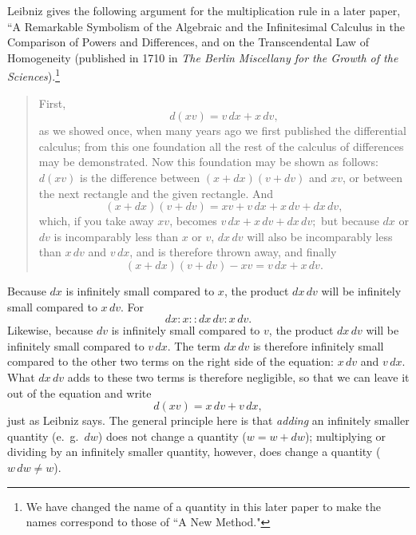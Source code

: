 \documentclass[twoside,openright]{article}
\begin{document}
 Leibniz gives the following argument for the multiplication rule in a
 later paper, ``A Remarkable Symbolism of the Algebraic and the
 Infinitesimal Calculus in the Comparison of Powers and Differences,
 and on the Transcendental Law of Homogeneity (published in 1710 in
 {\em The Berlin Miscellany for the Growth of the
   Sciences}).\footnote{We have changed the name of a quantity in
   this later paper to make the names correspond to those of ``A New
   Method."}
 \begin{quote}
First, 
$$d(xv) = v\,dx + x\,dv,$$
as we showed once, when many years ago we first published the
differential calculus; from this one foundation all the rest of the
calculus of differences may be demonstrated.  Now this foundation may
be shown as follows: $d(xv)$ is the difference between $(x+dx)(v+dv)$
and $xv$, or between the next rectangle and the given rectangle.  And
$$(x+dx)(v+dv) = xv + v\,dx + x\,dv + dx\,dv,$$
which, if you take away $xv$, becomes
$v\,dx + x\,dv + dx\,dv;$
but because $dx$ or $dv$ is incomparably less than $x$ or $v$, $dx\,dv$ will
also be incomparably less than $x\,dv$ and $v\,dx$, and is therefore thrown
away, and finally
$$(x+dx)(v+dv) - xv = v\,dx + x\,dv.$$
\end{quote}

 
Because $dx$ is infinitely small compared to $x$, the product $dx\,dv$
will be infinitely small compared to $x\,dv$. For
$$dx \!:\! x :: dx\,dv \!:\! x\,dv.$$
Likewise, because $dv$ is infinitely small compared to $v$, the
product $dx\,dv$ will be infinitely small compared to $v\,dx$.  The
term $dx\,dv$ is therefore infinitely small compared to the other two
terms on the right side of the equation: $x\,dv$ and $v\,dx.$ What
$dx\,dv$ adds to these two terms is therefore negligible, so that we
can leave it out of the equation and write
$$d(xv) = x\,dv + v\,dx,$$
just as Leibniz says.  The general principle here is that {\em adding}
an infinitely smaller quantity (e.\ g.\ $dw$) does not change a
quantity ($w = w+ dw$); multiplying or dividing by an infinitely
smaller quantity, however, does change a quantity ($w\,dw \neq w$).
\end{document}

